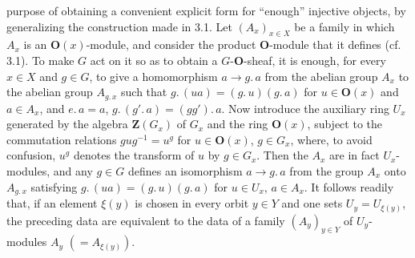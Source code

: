 \clearpage
{}

purpose of obtaining a convenient explicit form for ``enough'' injective
objects, by generalizing the construction made in 3.1.
Let $(A_x)_{x\in X}$ be a family in which $A_x$ is an ${\mathbf O}(x)$-module, and
consider the product ${\mathbf O}$-module that it defines (cf. 3.1). To make $G$ act on
it so as to obtain a $G$-${\mathbf O}$-sheaf, it is enough, for every $x\in X$ and
$g\in G$, to give a homomorphism $a\to g.\,a$ from the
abelian group $A_x$ to the abelian group $A_{g.\, x}$ such that $g.\,(ua)=(g.\,u)(g.\,a)$ for $u\in {\mathbf O}(x)$ and $a\in A_x$, and $e.\,a=a$, $g.\,(g'.\,a)=(gg').\,a$.
Now introduce the auxiliary ring $U_x$ generated by the algebra
$\mathbf Z(G_x)$ of $G_x$ and the ring ${\mathbf O}(x)$, subject to the commutation
relations $gug^{-1}=u^g$ for $u\in {\mathbf O}(x)$, $g\in G_x$,
where, to avoid confusion, $u^g$ denotes the transform of $u$ by $g\in G_x$.
Then the $A_x$ are in fact $U_x$-modules, and any $g\in G$ defines an
isomorphism $a\to g.\,a$ from the group $A_x$ onto
$A_{g.\, x}$ satisfying $g.\,(ua)=(g.\,u)(g.\,a)$ for $u\in U_x$, $a\in A_x$.
It follows readily that, if an element $\xi(y)$ is chosen in every orbit
$y\in Y$ and one sets $U_y=U_{\xi(y)}$, the preceding data are equivalent to
the data of a family $(A_y)_{y\in Y}$ of $U_y$-modules
$A_y$ $(=A_{\xi(y)})$.

